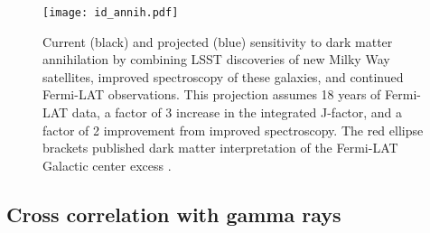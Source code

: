 \begin{figure}
\centering
\texttt{[image: id\_annih.pdf]}
\caption{Current (black) and projected (blue) sensitivity to dark matter annihilation by combining LSST discoveries of new Milky Way satellites, improved spectroscopy of these galaxies, and continued Fermi-LAT observations. This projection assumes 18 years of Fermi-LAT data, a factor of 3 increase in the integrated J-factor, and a factor of 2 improvement from improved spectroscopy. The red ellipse brackets published dark matter interpretation of the Fermi-LAT Galactic center excess \citep[\ie,][]{Gordon:2013, Abazajian:2014}.
\label{fig:indirect}
}
\end{figure}

\subsection{Cross correlation with gamma rays }



